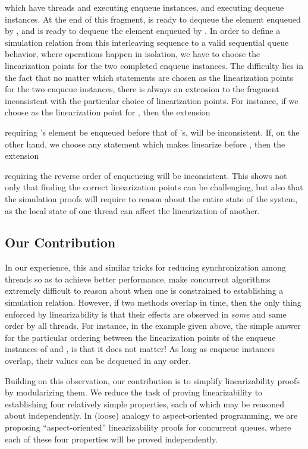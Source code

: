 \documentclass{LMCS}
\begin{document}
which have threads  and  executing enqueue instances,  and  executing dequeue instances. 
At the end of this fragment,  is ready to dequeue the element enqueued by , and  is ready to dequeue the element enqueued by .
In order to define a simulation relation from this interleaving sequence to a valid sequential queue behavior, where operations happen in isolation, we have to choose the linearization points for the two completed enqueue instances. 
The difficulty lies in the fact that no matter which statements are chosen as the linearization points for the two enqueue instances, there is always an extension to the fragment inconsistent with the particular choice of linearization points. 
For instance, if we choose  as the linearization point for , then the extension 

requiring 's element be enqueued before that of 's, will be inconsistent.
If, on the other hand, we choose any statement which makes  linearize before , then the extension

requiring the reverse order of enqueueing will be inconsistent. 
This shows not only that finding the correct linearization points can be challenging,
but also that the simulation proofs will require to reason about the entire state of the
system,
as the local state of one thread can affect the linearization of another.


\subsection*{Our Contribution}

In our experience, this and similar tricks for reducing synchronization among threads so as to achieve better performance, make concurrent algorithms extremely difficult to reason about when one is constrained to establishing a simulation relation.
However, if two methods overlap in time, then the only thing enforced by linearizability is that their effects are observed in {\em some} and same order by all threads.
For instance, in the example given above, the simple answer for the particular ordering between the linearization points of the enqueue instances of  and , is that it does not matter!
As long as enqueue instances overlap, their values can be dequeued in any order.

Building on this observation, our contribution is to simplify linearizability proofs by modularizing them.
We reduce the task of proving linearizability to establishing four relatively
simple properties, each of which may be reasoned about independently.
In (loose) analogy to aspect-oriented programming, 
we are proposing ``aspect-oriented'' linearizability proofs for concurrent queues,
where each of these four properties will be proved independently.
\end{document}
